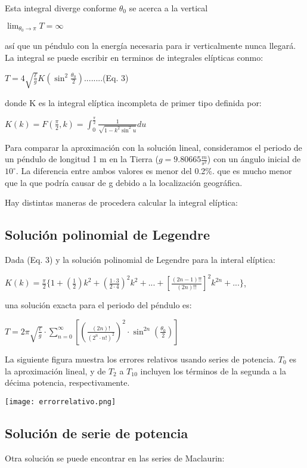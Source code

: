\documentclass[12pt]{article}
\begin{document}
Esta integral diverge conforme $\theta_0$ se acerca a la vertical

$\lim_{\theta_0 \to \pi}T=\infty$

\noindent así que un péndulo con la energía necesaria para ir verticalmente nunca llegará. La integral se puede escribir en terminos de integrales elípticas conmo:

$T=4\sqrt{\frac{\ell}{g}}K(\sin^2{\frac{\theta_0}{2}})$........(Eq. 3)

\noindent donde K es la integral elíptica incompleta de primer tipo definida por:

$K(k)=F(\frac{\pi}{2}, k)=\int_{0}^{\frac{\pi}{2}}\frac{1}{\sqrt{1-k^2\sin^2{u}}}du$

\noindent Para comparar la aproximación con la solución lineal, consideramos el periodo de un péndulo de longitud 1 m en la Tierra ($g=9.80665\frac{m}{s^2}$) con un ángulo inicial de $10^\circ$. La diferencia entre ambos valores es menor del 0.2\%. que es mucho menor que la que podría causar de g debido a la localización geográfica.

Hay distintas maneras de procedera calcular la integral elíptica:

\subsection{Solución polinomial de Legendre}

Dada (Eq. 3) y la solución polinomial de Legendre para la interal elíptica:

$K(k)=\frac{\pi}{2}\{1+(\frac{1}{2})k^2+(\frac{1\cdot3}{2\cdot4})^2k^2+...+[\frac{(2n-1)!!}{(2n)!!}]^2k^{2n}+...\}$, 

\noindent una solución exacta para el periodo del péndulo es:

$T=2\pi\sqrt{\frac{\ell}{g}}\cdot\sum_{n=0}^{\infty}\left[\left(\frac{(2n)!}{(2^{n}\cdot{n!})^2}\right)^2\cdot\sin^{2n}(\frac{\theta_0}{2})\right]$

La siguiente figura muestra los errores relativos usando series de potencia. $T_0$ es la aproximación lineal, y de $T_2$ a $T_{10}$ incluyen los términos de la segunda a la décima potencia, respectivamente.

\begin{center}
\texttt{[image: errorrelativo.png]}
\end{center}

\subsection{Solución de serie de potencia}
Otra solución se puede encontrar en las series de Maclaurin:
\end{document}

